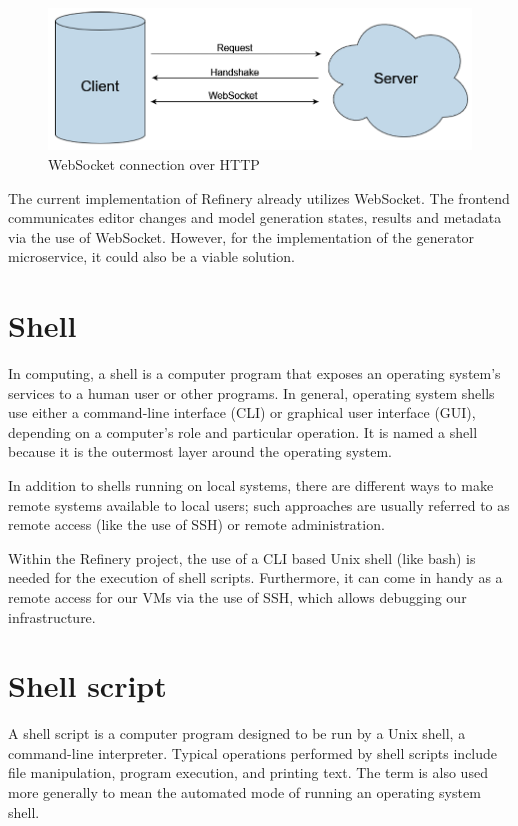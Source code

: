 	\begin{figure}[h!]
		\includegraphics{include/imgs/websocket.PNG}
		\caption{WebSocket connection over HTTP}
	\end{figure}

	The current implementation of Refinery already utilizes WebSocket. The frontend communicates editor changes and model generation
	states, results and metadata via the use of WebSocket. However, for the implementation of the generator microservice, it could also be a viable solution.

\section{Shell} \label{backgrshell}
	In computing, a shell \cite{shell} is a computer program that exposes an operating system's services to a human user or other programs. 
	In general, operating system shells use either a command-line interface (CLI) or graphical user interface (GUI), 
	depending on a computer's role and particular operation. It is named a shell because it is the outermost layer around the operating system.

	In addition to shells running on local systems, there are different ways to make remote 
	systems available to local users; such approaches are usually referred to as remote access (like the use of SSH) or remote administration.

	Within the Refinery project, the use of a CLI based Unix shell (like bash) is needed for the execution of shell scripts. Furthermore, it can come in handy 
	as a remote access for our VMs via the use of SSH, which allows debugging our infrastructure.

\section{Shell script} \label{backgrshellscript}
	A shell script \cite{shellscript} is a computer program designed to be run by a Unix shell, a command-line interpreter. Typical operations performed by shell scripts include file manipulation, program execution, and printing text.
	The term is also used more generally to mean the automated mode of running an operating system shell.

